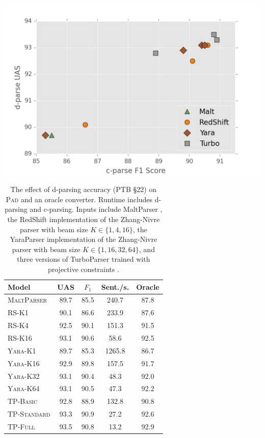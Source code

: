 \documentclass[11pt,letterpaper]{article}
\newcommand{\ParseName}{\textsc{Pad}\xspace}
\begin{document}
\begin{table}[t!]
  \centering
  \small
  \includegraphics[scale=0.45]{../notebooks/camera_ready_plot.png}
  \begin{tabular}[scale=0.8]{lcccc}
    \toprule
    Model & UAS  & $F_1$ & Sent./s.  & Oracle  \\
    \midrule
    \textsc{MaltParser}  & 89.7 & 85.5 & 240.7& 87.8 \\
    \textsc{RS-K1}       & 90.1 & 86.6 & 233.9& 87.6 \\
    \textsc{RS-K4}       & 92.5 & 90.1 & 151.3& 91.5 \\
    \textsc{RS-K16}      & 93.1 & 90.6 & 58.6 & 92.5 \\
    \textsc{Yara-K1}     & 89.7 & 85.3 & 1265.8 & 86.7 \\
    \textsc{Yara-K16}     & 92.9 & 89.8 & 157.5 & 91.7 \\
    \textsc{Yara-K32}     & 93.1 & 90.4 & 48.3 & 92.0 \\
    \textsc{Yara-K64}     & 93.1 & 90.5 & 47.3 & 92.2 \\
    \textsc{TP-Basic}    & 92.8 & 88.9 & 132.8& 90.8 \\
    \textsc{TP-Standard} & 93.3 & 90.9 & 27.2 & 92.6 \\
    \textsc{TP-Full}     & 93.5 & 90.8 & 13.2 & 92.9 \\
    \bottomrule
  \end{tabular}
  \caption{The effect of d-parsing accuracy (PTB \S 22)
    on \ParseName{} and an oracle converter.  Runtime includes
    d-parsing and c-parsing.  
    Inputs include 
 MaltParser \cite{nivre2006maltparser}, 
    the RedShift implementation of the Zhang-Nivre parser
    \cite{zhang2011transition} with beam size $K \in \{1, 4, 16\}$,
the YaraParser implementation of the Zhang-Nivre parser
    \cite{zhang2011transition} with beam size $K \in \{1, 16, 32, 64\}$, and three versions of TurboParser trained with projective constraints
    \cite{martins2013turning}.
\label{tab:oracle} }

\end{table}
\end{document}
